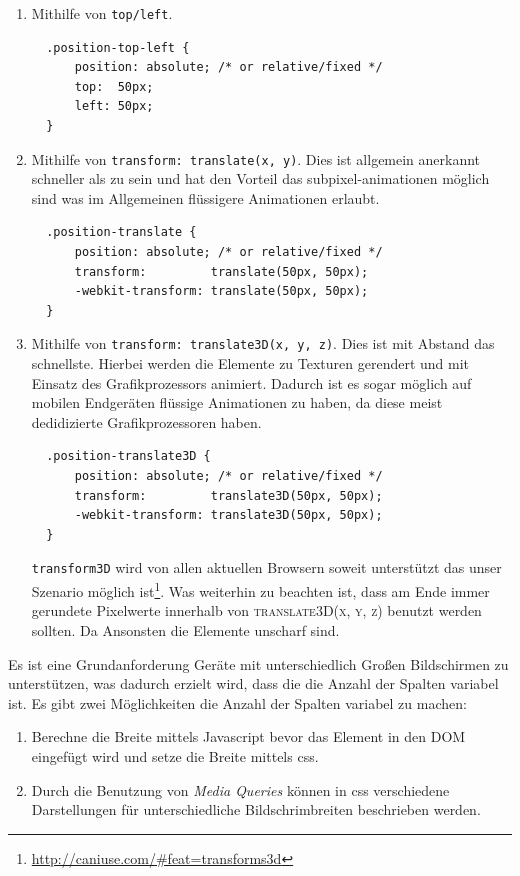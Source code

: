\documentclass[12pt,twoside]{book}
\begin{document}
\begin{enumerate}
  \item Mithilfe von \texttt{top/left}.\\
  \begin{verbatim}
  .position-top-left {
      position: absolute; /* or relative/fixed */
      top:  50px;
      left: 50px;
  }
  \end{verbatim}
  \item Mithilfe von \texttt{transform: translate(x, y)}. Dies ist allgemein anerkannt schneller als zu sein und hat den Vorteil das subpixel-animationen möglich sind was im Allgemeinen flüssigere Animationen erlaubt. \\
  \begin{verbatim}
  .position-translate {
      position: absolute; /* or relative/fixed */
      transform:         translate(50px, 50px);
      -webkit-transform: translate(50px, 50px);
  }
  \end{verbatim}
  \item Mithilfe von \texttt{transform: translate3D(x, y, z)}. Dies ist mit Abstand das schnellste. Hierbei werden die Elemente zu Texturen gerendert und mit Einsatz des Grafikprozessors animiert. Dadurch ist es sogar möglich auf mobilen Endgeräten flüssige Animationen zu haben, da diese meist dedidizierte Grafikprozessoren haben.
  \begin{verbatim}
  .position-translate3D {
      position: absolute; /* or relative/fixed */
      transform:         translate3D(50px, 50px);
      -webkit-transform: translate3D(50px, 50px);
  }
  \end{verbatim}
  \texttt{transform3D} wird von allen aktuellen Browsern soweit unterstützt das unser Szenario möglich ist\footnote{\url{http://caniuse.com/\#feat=transforms3d}}. Was weiterhin zu beachten ist, dass am Ende immer gerundete Pixelwerte innerhalb von \textsc{translate3D(x, y, z)} benutzt werden sollten. Da Ansonsten die Elemente unscharf sind.

\end{enumerate}

Es ist eine Grundanforderung Geräte mit unterschiedlich Großen Bildschirmen zu unterstützen, was dadurch erzielt wird, dass die die Anzahl der Spalten variabel ist.
Es gibt zwei Möglichkeiten die Anzahl der Spalten variabel zu machen:

\begin{enumerate}
  \item Berechne die Breite mittels Javascript bevor das Element in den DOM eingefügt wird und setze die Breite mittels css.
  \item Durch die Benutzung von \textit{Media Queries} können in css verschiedene Darstellungen für unterschiedliche Bildschrimbreiten beschrieben werden. 
\end{enumerate}
\end{document}
